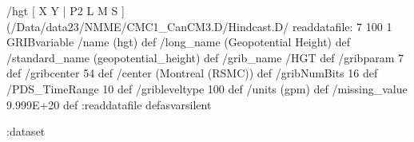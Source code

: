 \begin{ingrid}
/hgt {
[ X Y | P2 L M S ] (/Data/data23/NMME/CMC1_CanCM3.D/Hindcast.D/%
readdatafile:
7 100 1 GRIBvariable 
/name (hgt) def
/long_name (Geopotential Height) def
/standard_name (geopotential_height) def
/grib_name /HGT def
/gribparam 7 def
/gribcenter 54 def
/center (Montreal (RSMC)) def
/gribNumBits 16 def
/PDS_TimeRange 10 def
/gribleveltype 100 def
/units (gpm) def
/missing_value 9.999E+20 def
:readdatafile
} defasvarsilent

:dataset
\end{ingrid}
